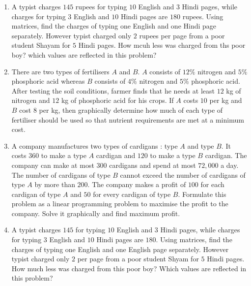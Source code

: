 \begin{enumerate}
	\item A typist charges $145$ rupees for typing $10$ English and $3$ Hindi pages, while charges for typing $3$ English and $10$ Hindi pages are $180$ rupees. Using matrices,
	      find the charges of typing one English and one Hindi page separately.
	      However typist charged only $2$ rupees per page from a poor student Shayam for $5$ Hindi pages.
	      How mcuh less was charged from ths poor boy? which values are reflected in this problem?
	\item There are two types of fertilisers $A$ and $B$. $A$ consists of $12$\% nitrogen and $5$\% phosphoric acid whereas $B$ consists of $4$\% nitrogen and $5$\% phosphoric acid. After testing the soil conditions, farmer finds that he needs at least $12$ kg of nitrogen and $12$ kg of phosphoric acid for his crops. If $A$ costs \rupee $10$ per kg and $B$ cost \rupee $8$ per kg, then graphically determine how much of each type of fertiliser should be used so that nutrient requirements are met at a minimum cost.
	\item A company manufactures two types of cardigans : type $A$ and type $B$. It costs \rupee $360$ to make a type $A$ cardigan and \rupee $120$ to make a type $B$ cardigan. The company can make at most $300$ cardigans and spend at most \rupee $72,000$ a day. The number of cardigans of type $B$ cannot exceed the number of cardigans of type $A$ by more than $200$. The company makes a profit of \rupee $100$ for each cardigan of type $A$ and \rupee $50$ for every cardigan of type $B$. Formulate this problem as a linear programming problem to maximise the profit to the company. Solve it graphically and find maximum profit.
	\item A typist charges \rupee $145$ for typing $10$ English and $3$ Hindi pages, while charges for typing $3$ English and $10$ Hindi pages are \rupee $180$. Using matrices, find the charges of typing one English and one English page separately. However typist charged only \rupee $2$ per page from a poor student Shyam for $5$ Hindi pages. How much less was charged from this poor boy? Which values are reflected in this problem?


\end{enumerate}

